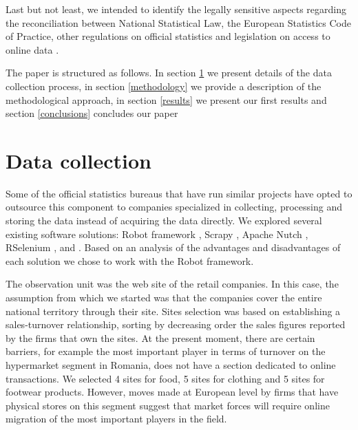\documentclass[]{article}
\begin{document}
	
	Last but not least, we intended to identify the legally sensitive aspects regarding the reconciliation between 
	National Statistical Law, the European Statistics Code of Practice, other regulations on official statistics 
	and legislation on access to online data \cite{swier}.
	
	The paper is structured as follows. In section \ref{section2} we present details of the data collection process, 
	in section \ref{methodology} we provide a description of the methodological approach, in section \ref{results} we present our first results and 
	section \ref{conclusions} concludes our paper


\section{Data collection}\label{section2}

Some of the official statistics bureaus that have run similar projects have opted to outsource this component to companies specialized 
in collecting, processing and storing the data instead of acquiring the data directly. We explored several existing software solutions: 
Robot framework \cite{robot2018}, Scrapy \cite{scrapy1}, \cite{scrapy2} Apache Nutch \cite{nutch}, RSelenium \cite{rs1}, \cite{rs2} 
and \cite{rvest}. 
Based on an analysis of the advantages and disadvantages of each solution we chose to work with the Robot framework. 


The observation unit was the web site of the retail companies. In this case, the assumption from which we started was 
that the companies cover the entire national territory through their site. Sites selection was based on establishing a 
sales-turnover relationship, sorting by decreasing order the sales figures reported by the firms that own the sites. 
At the present moment, there are certain barriers, for example the most important player in terms of turnover on the 
hypermarket segment in Romania, does not have a section dedicated to online transactions. We selected 4 sites for food, 
5 sites for clothing and 5 sites for footwear products. However, moves made at European level by firms that have physical 
stores on this segment suggest that market forces will require online migration of the most important players in the field.
\end{document}
